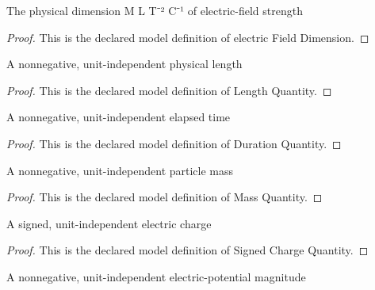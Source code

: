 \begin{definition}
  \label{def:physics:phyx-mini-0993:phyxminiproblems-problemphyxmini0993-electricfielddimension}
  The physical dimension M L T⁻² C⁻¹ of electric-field strength
\end{definition}
\begin{proof}
  This is the declared model definition of electric Field Dimension.
\end{proof}
\begin{definition}
  \label{def:physics:phyx-mini-0993:phyxminiproblems-problemphyxmini0993-lengthquantity}
  A nonnegative, unit-independent physical length
\end{definition}
\begin{proof}
  This is the declared model definition of Length Quantity.
\end{proof}
\begin{definition}
  \label{def:physics:phyx-mini-0993:phyxminiproblems-problemphyxmini0993-durationquantity}
  A nonnegative, unit-independent elapsed time
\end{definition}
\begin{proof}
  This is the declared model definition of Duration Quantity.
\end{proof}
\begin{definition}
  \label{def:physics:phyx-mini-0993:phyxminiproblems-problemphyxmini0993-massquantity}
  A nonnegative, unit-independent particle mass
\end{definition}
\begin{proof}
  This is the declared model definition of Mass Quantity.
\end{proof}
\begin{definition}
  \label{def:physics:phyx-mini-0993:phyxminiproblems-problemphyxmini0993-signedchargequantity}
  A signed, unit-independent electric charge
\end{definition}
\begin{proof}
  This is the declared model definition of Signed Charge Quantity.
\end{proof}
\begin{definition}
  \label{def:physics:phyx-mini-0993:phyxminiproblems-problemphyxmini0993-electricpotentialmagnitudequantity}
  A nonnegative, unit-independent electric-potential magnitude
\end{definition}
